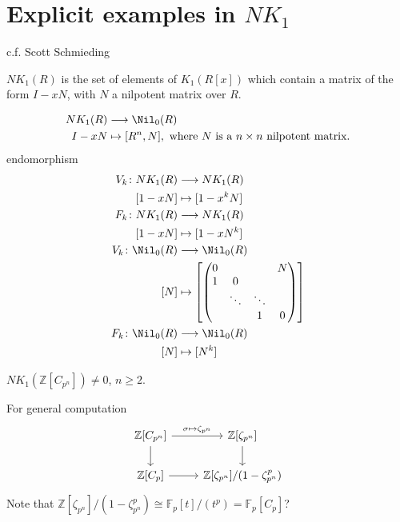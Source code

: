 \section{Explicit examples in $NK_1$}
c.f. Scott Schmieding
\begin{lemma}
	$NK_1(R)$ is the set of elements of $K_1(R[x])$ which contain a matrix of the form $I-xN$, with $N$ a nilpotent matrix over $R$.
\end{lemma}
\begin{align*}
NK_1(R) &\longrightarrow \Nil_0(R)\\
I-xN &\mapsto [R^n,N], \text{ where $N$ is a $n\times n$ nilpotent matrix.}
\end{align*}
endomorphism 
\begin{align*}
V_k \colon NK_1(R) &\longrightarrow NK_1(R) \\
[1-xN] &\mapsto [1-x^kN]\\
F_k \colon NK_1(R) &\longrightarrow NK_1(R) \\
[1-xN] &\mapsto [1-xN^k]\\
V_k \colon \Nil_0(R) &\longrightarrow \Nil_0(R) \\
[N] &\mapsto \left[\begin{pmatrix}
	0& &  &N\\1&0 & &\\ &\ddots&\ddots&\\ & &1&0
\end{pmatrix}\right]\\
F_k \colon \Nil_0(R) &\longrightarrow \Nil_0(R) \\
[N] &\mapsto [N^k]
\end{align*}

$NK_1(\mathbb{Z}[C_{p^n}])\neq 0$, $n\geq 2$.


For general computation
\[\begin{tikzcd}
			\mathbb{Z}[C_{p^n}] \ar[r,"\sigma \mapsto \zeta_{p^n}"] \ar[d]& \mathbb{Z}[\zeta_{p^n}]\ar[d]\\
			\mathbb{Z}[C_p] \ar[r] & \mathbb{Z}[\zeta_{p^n}]/(1-\zeta_{p^n}^p)
		\end{tikzcd}\]
Note that $\mathbb{Z}[\zeta_{p^n}]/(1-\zeta_{p^n}^p)\cong \mathbb{F}_p[t]/(t^p)=\mathbb{F}_p[C_p]$?

